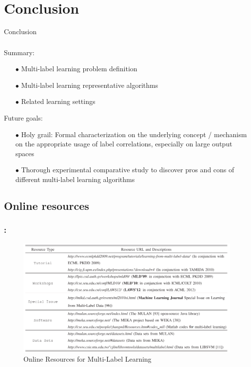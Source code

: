 \documentclass{beamer}
\begin{document}
\section{Conclusion}
\begin{frame}
\Huge{\centerline{Conclusion}}
\end{frame}
\begin{frame}
\frametitle{\insertsection}
Summary:
\begin{itemize}
\item[$\bullet$] Multi-label learning problem definition
\item[$\bullet$] Multi-label learning representative algorithms
\item[$\bullet$] Related learning settings
\end{itemize}

Future goals:
\begin{itemize}
\item[$\bullet$] Holy grail: Formal characterization on the underlying concept / mechanism on the appropriate usage of label correlations, especially on large output spaces
\item[$\bullet$] Thorough experimental comparative study to discover pros and cons of different multi-label learning algorithms
\end{itemize}
\end{frame}

\subsection{Online resources}
\begin{frame}
\frametitle{\insertsection : \insertsubsection}
\begin{figure}
	\begin{center}
		\includegraphics[scale = 0.47]{images/online.png}
		\caption{Online Resources for Multi-Label Learning}
	\end{center}
\end{figure}
\end{frame}
\end{document}
